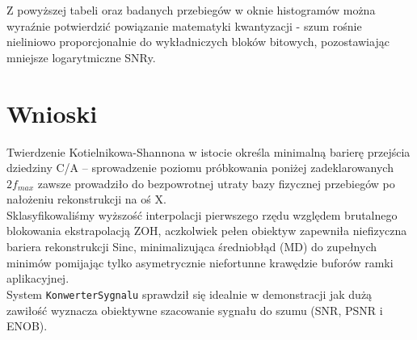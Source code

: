 \documentclass[12pt]{article}
\begin{document}
Z powyższej tabeli oraz badanych przebiegów w oknie histogramów można wyraźnie potwierdzić powiązanie matematyki kwantyzacji - szum rośnie nieliniowo proporcjonalnie do wykładniczych bloków bitowych, pozostawiając mniejsze logarytmiczne SNRy.


\newpage
\section{Wnioski}
Twierdzenie Kotielnikowa-Shannona w istocie określa minimalną barierę przejścia dziedziny C/A – sprowadzenie poziomu próbkowania poniżej zadeklarowanych $2f_{max}$ zawsze prowadziło do bezpowrotnej utraty bazy fizycznej przebiegów po nałożeniu rekonstrukcji na oś X.\\
Sklasyfikowaliśmy wyższość interpolacji pierwszego rzędu względem brutalnego blokowania ekstrapolacją ZOH, aczkolwiek pełen obiektyw zapewniła niefizyczna bariera rekonstrukcji Sinc, minimalizująca średniobłąd (MD) do zupełnych minimów pomijając tylko asymetrycznie niefortunne krawędzie buforów ramki aplikacyjnej.\\
System \texttt{KonwerterSygnalu} sprawdził się idealnie w demonstracji jak dużą zawiłość wyznacza obiektywne szacowanie sygnału do szumu (SNR, PSNR i ENOB).
\end{document}
